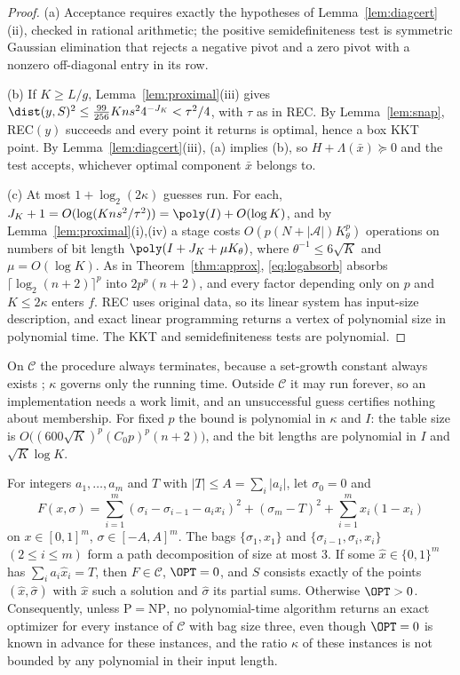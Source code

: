 \begin{proof}
(a) Acceptance requires exactly the hypotheses of
Lemma~\ref{lem:diagcert}(ii), checked in rational arithmetic; the positive
semidefiniteness test is symmetric Gaussian elimination that rejects a
negative pivot and a zero pivot with a nonzero off-diagonal entry in its row.

(b) If $K\ge L/g$, Lemma~\ref{lem:proximal}(iii) gives
$\dist(y,S)^2\le\frac{99}{256}Kns^24^{-J_K}<\tau^2/4$, with $\tau$ as in REC. By
Lemma~\ref{lem:snap}, REC$(y)$ succeeds and every point it returns is
optimal, hence a box KKT point. By Lemma~\ref{lem:diagcert}(iii), (a) implies
(b), so $H+\Lambda(\bar x)\succeq0$ and the test accepts, whichever optimal
component $\bar x$ belongs to.

(c) At most $1+\log_2(2\kappa)$ guesses run. For each,
$J_K+1=O(\log(Kns^2/\tau^2))=\poly(I)+O(\log K)$, and by
Lemma~\ref{lem:proximal}(i),(iv) a stage costs
$O(p(N+|\mathcal A|)K_\theta^p)$ operations on numbers of bit length
$\poly(I+J_K+\mu K_\theta)$, where $\theta^{-1}\le6\sqrt K$ and $\mu=O(\log K)$.
As in Theorem~\ref{thm:approx}, \eqref{eq:logabsorb} absorbs
$\lceil\log_2(n+2)\rceil^p$ into $2p^p(n+2)$, and every factor depending
only on $p$ and $K\le2\kappa$ enters $f$. REC uses original data, so its
linear system has input-size description, and exact linear programming
returns a vertex of polynomial size in polynomial time. The KKT and semidefiniteness tests are polynomial.
\end{proof}

On $\mathcal C$ the procedure always terminates, because a set-growth
constant always exists \cite[Theorem~3.3]{LuoSturm2000}; $\kappa$ governs only
the running time. Outside $\mathcal C$ it may run forever, so an
implementation needs a work limit, and an unsuccessful guess certifies
nothing about membership. For fixed $p$ the bound is polynomial in $\kappa$
and $I$: the table size is $O\bigl((600\sqrt K)^p(C_0p)^p(n+2)\bigr)$, and the
bit lengths are polynomial in $I$ and $\sqrt K\log K$.

\begin{proposition}\label{prop:sshard}
For integers $a_1,\ldots,a_m$ and $T$ with $|T|\le A=\sum_i|a_i|$, let
$\sigma_0=0$ and
\[
F(x,\sigma)=\sum_{i=1}^m(\sigma_i-\sigma_{i-1}-a_ix_i)^2+(\sigma_m-T)^2
+\sum_{i=1}^mx_i(1-x_i)
\]
on $x\in[0,1]^m$, $\sigma\in[-A,A]^m$. The bags $\{\sigma_1,x_1\}$ and
$\{\sigma_{i-1},\sigma_i,x_i\}$ $(2\le i\le m)$ form a path decomposition of
size at most $3$. If some $\hat x\in\{0,1\}^m$ has $\sum_ia_i\hat x_i=T$, then
$F\in\mathcal C$, $\OPT=0$, and $S$ consists exactly of the points
$(\hat x,\hat\sigma)$ with $\hat x$ such a solution and $\hat\sigma$ its
partial sums. Otherwise $\OPT>0$. Consequently, unless $\mathrm P=\mathrm{NP}$,
no polynomial-time algorithm returns an exact optimizer for every instance of
$\mathcal C$ with bag size three, even though $\OPT=0$ is known in advance for
these instances, and the ratio $\kappa$ of these instances is not bounded by
any polynomial in their input length.
\end{proposition}

